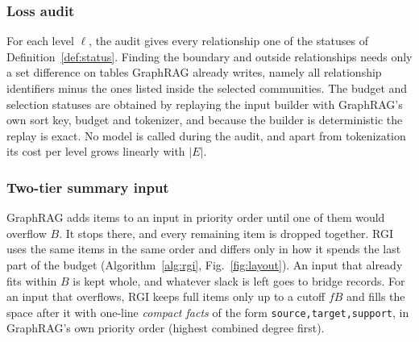 \documentclass{ieeeaccess}
\theoremstyle{remark}
\begin{document}
\subsubsection{Loss audit}
For each level $\ell$, the audit gives every relationship one of the statuses of Definition~\ref{def:status}. Finding the boundary and outside relationships needs only a set difference on tables GraphRAG already writes, namely all relationship identifiers minus the ones listed inside the selected communities. The budget and selection statuses are obtained by replaying the input builder with GraphRAG's own sort key, budget and tokenizer, and because the builder is deterministic the replay is exact. No model is called during the audit, and apart from tokenization its cost per level grows linearly with $|E|$.

\subsubsection{Two-tier summary input}
GraphRAG adds items to an input in priority order until one of them would overflow $B$. It stops there, and every remaining item is dropped together. RGI uses the same items in the same order and differs only in how it spends the last part of the budget (Algorithm~\ref{alg:rgi}, Fig.~\ref{fig:layout}). An input that already fits within $B$ is kept whole, and whatever slack is left goes to bridge records. For an input that overflows, RGI keeps full items only up to a cutoff $fB$ and fills the space after it with one-line \emph{compact facts} of the form \texttt{source,target,support}, in GraphRAG's own priority order (highest combined degree first).
\end{document}
